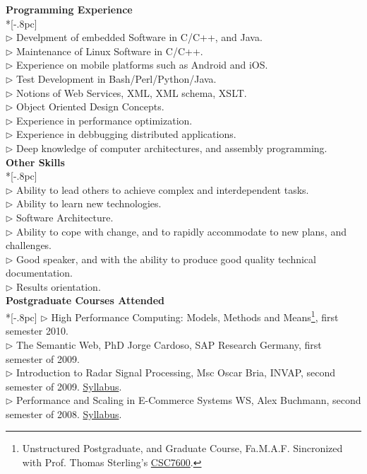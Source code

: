 \documentclass[a4paper,11pt,english]{article}
\begin{document}
{\large \bf Programming Experience} \\*[-.8pc]
\underline{\hspace{6in}} \\
$\triangleright$ Develpment of embedded Software in C/C++, and Java.\\
$\triangleright$ Maintenance of Linux Software in C/C++.\\
$\triangleright$ Experience on mobile platforms such as Android and iOS.\\
$\triangleright$ Test Development in Bash/Perl/Python/Java.\\
$\triangleright$ Notions of Web Services, XML, XML schema, XSLT.\\
$\triangleright$ Object Oriented Design Concepts.\\
$\triangleright$ Experience in performance optimization.\\
$\triangleright$ Experience in debbugging distributed applications.\\
$\triangleright$ Deep knowledge of computer architectures, and assembly programming.\\

\newpage
{\large \bf Other Skills} \\*[-.8pc]
\underline{\hspace{6in}} \\
$\triangleright$ Ability to lead others to achieve complex and interdependent tasks.\\
$\triangleright$ Ability to learn new technologies.\\
$\triangleright$ Software Architecture.\\
$\triangleright$ Ability to cope with change, and to rapidly accommodate to new plans, and challenges.\\
$\triangleright$ Good speaker, and with the ability to produce good quality technical documentation.\\
$\triangleright$ Results orientation.\\


{\large \bf Postgraduate Courses Attended}\\ *[-.8pc]
\underline{\hspace{6in}} 
$\triangleright$ High Performance Computing: Models, Methods and Means\footnote{Unstructured Postgraduate,
and Graduate Course, Fa.M.A.F. Sincronized with Prof. Thomas Sterling's 
\href{http://www.cct.lsu.edu/csc7600/Home.html}{CSC7600}.}, first semester 2010.\\
$\triangleright$ The Semantic Web, PhD Jorge Cardoso, SAP Research Germany, first semester of 2009.\\
$\triangleright$ Introduction to Radar Signal Processing, Msc Oscar Bria, 
INVAP, second semester of 2009. \href{http://postgrado.info.unlp.edu.ar/Carrera/Programas/Contenidos_IPSR.pdf}{Syllabus}.\\
$\triangleright$ Performance and Scaling in E-Commerce Systems WS, Alex Buchmann, second semester of 2008. 
\href{http://www.dvs.tu-darmstadt.de/teaching/perf/2008/}{Syllabus}.\\
\end{document}
